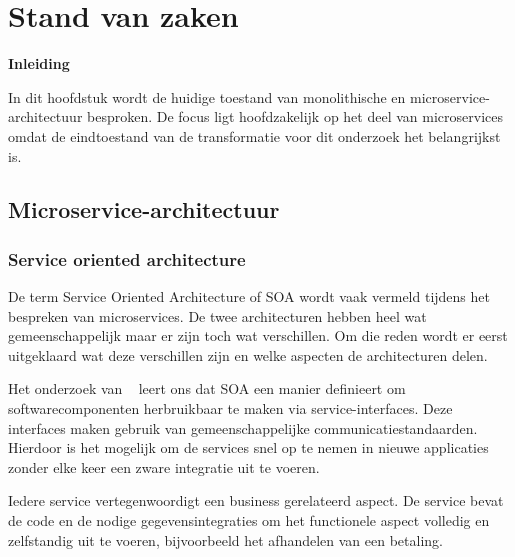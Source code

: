 \label{ch:stand-van-zaken}
\graphicspath{{./img/}}

\chapter{Stand van zaken}
\textbf{Inleiding}

In dit hoofdstuk wordt de huidige toestand van monolithische en microservice-architectuur besproken. De focus ligt hoofdzakelijk op het deel van microservices omdat de eindtoestand van de transformatie voor dit onderzoek het belangrijkst is.

\section{Microservice-architectuur}

\subsection{Service oriented architecture}
De term Service Oriented Architecture of SOA wordt vaak vermeld tijdens het bespreken van microservices. De twee architecturen hebben heel wat gemeenschappelijk maar er zijn toch wat verschillen. Om die reden wordt er eerst uitgeklaard wat deze verschillen zijn en welke aspecten de architecturen delen. 

Het onderzoek van ~\autocite{Schaik2014} leert ons dat SOA een manier definieert om softwarecomponenten herbruikbaar te maken via service-interfaces. Deze interfaces maken gebruik van gemeenschappelijke communicatiestandaarden. Hierdoor is het mogelijk om de services snel op te nemen in nieuwe applicaties zonder elke keer een zware integratie uit te voeren. 

Iedere service vertegenwoordigt een business gerelateerd aspect. De service bevat de code en de nodige gegevensintegraties om het functionele aspect volledig en zelfstandig uit te voeren, bijvoorbeeld het afhandelen van een betaling.\\


